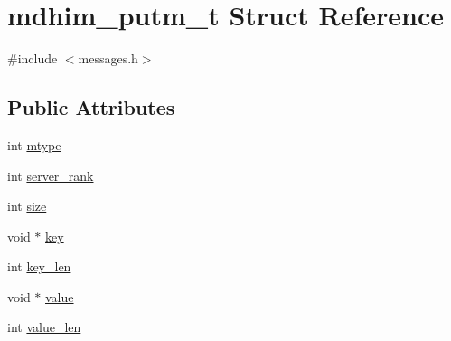 \hypertarget{structmdhim__putm__t}{\section{mdhim\-\_\-putm\-\_\-t Struct Reference}
\label{d6/dcd/structmdhim__putm__t}
}


{\ttfamily \#include $<$messages.\-h$>$}

\subsection*{Public Attributes}
\begin{DoxyCompactItemize}
\item 
int \hyperlink{structmdhim__putm__t_a632ccc930561029cfbbb28ec2b9929a4}{mtype}
\item 
int \hyperlink{structmdhim__putm__t_ad51fbdc39b6f3f8951b4e87a4f57e3bd}{server\-\_\-rank}
\item 
int \hyperlink{structmdhim__putm__t_aa12607649b47c8489b4a79039b69c629}{size}
\item 
void $\ast$ \hyperlink{structmdhim__putm__t_a6b5ee783b09f0039b09597e25005396e}{key}
\item 
int \hyperlink{structmdhim__putm__t_afbac7bbcd98d8489c502fbd6599964a0}{key\-\_\-len}
\item 
void $\ast$ \hyperlink{structmdhim__putm__t_adac45376bec0e989940d3a2b4a374daf}{value}
\item 
int \hyperlink{structmdhim__putm__t_af8cba256ae6e9003d55bc640c41f41e1}{value\-\_\-len}
\end{DoxyCompactItemize}


